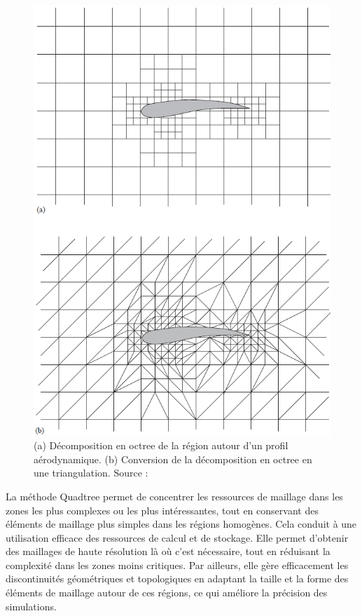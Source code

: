 \begin{figure}[!h]
    \centering
    \includegraphics[scale=0.65]{images/octree decomposition.png}
    \caption{(a) Décomposition en octree de la région autour d'un profil aérodynamique. (b) Conversion de la décomposition en octree en une triangulation. Source : \cite{baker2005mesh}}
    \label{fig:octree decomposition}
\end{figure}

La méthode Quadtree permet de concentrer les ressources de maillage dans les zones les plus complexes ou les plus intéressantes, tout en conservant des éléments de maillage plus simples dans les régions homogènes. Cela conduit à une utilisation efficace des ressources de calcul et de stockage. Elle permet d'obtenir des maillages de haute résolution là où c'est nécessaire, tout en réduisant la complexité dans les zones moins critiques. Par ailleurs, elle gère efficacement les discontinuités géométriques et topologiques en adaptant la taille et la forme des éléments de maillage autour de ces régions, ce qui améliore la précision des simulations.

